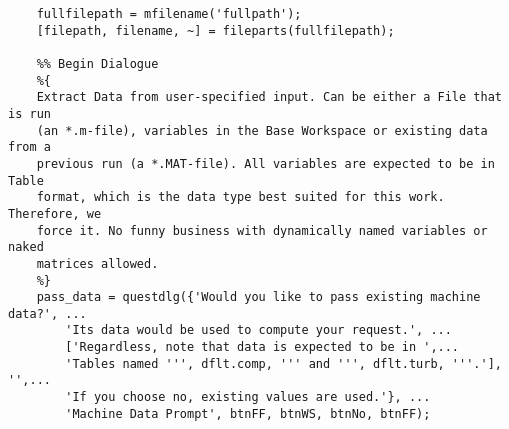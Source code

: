 \begin{verbatim}
    fullfilepath = mfilename('fullpath');
    [filepath, filename, ~] = fileparts(fullfilepath);

    %% Begin Dialogue
    %{
    Extract Data from user-specified input. Can be either a File that is run
    (an *.m-file), variables in the Base Workspace or existing data from a
    previous run (a *.MAT-file). All variables are expected to be in Table
    format, which is the data type best suited for this work. Therefore, we
    force it. No funny business with dynamically named variables or naked
    matrices allowed.
    %}
    pass_data = questdlg({'Would you like to pass existing machine data?', ...
        'Its data would be used to compute your request.', ...
        ['Regardless, note that data is expected to be in ',...
        'Tables named ''', dflt.comp, ''' and ''', dflt.turb, '''.'], '',...
        'If you choose no, existing values are used.'}, ...
        'Machine Data Prompt', btnFF, btnWS, btnNo, btnFF);


\end{verbatim}
